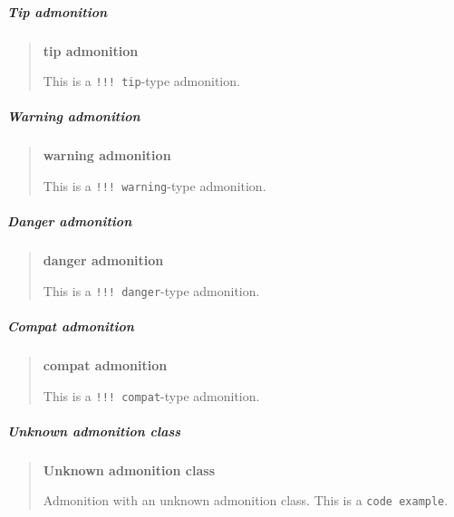 \subparagraph{Tip admonition}



\label{8478099471110135607}{}


\begin{quote}
\textbf{{\textquotesingle}tip{\textquotesingle} admonition}

This is a \texttt{!!! tip}-type admonition.

\end{quote}


\subparagraph{Warning admonition}



\label{16113256282093947986}{}


\begin{quote}
\textbf{{\textquotesingle}warning{\textquotesingle} admonition}

This is a \texttt{!!! warning}-type admonition.

\end{quote}


\subparagraph{Danger admonition}



\label{3138459326559650208}{}


\begin{quote}
\textbf{{\textquotesingle}danger{\textquotesingle} admonition}

This is a \texttt{!!! danger}-type admonition.

\end{quote}


\subparagraph{Compat admonition}



\label{8437579397049066350}{}


\begin{quote}
\textbf{{\textquotesingle}compat{\textquotesingle} admonition}

This is a \texttt{!!! compat}-type admonition.

\end{quote}


\subparagraph{Unknown admonition class}



\label{5611698449794175315}{}


\begin{quote}
\textbf{Unknown admonition class}

Admonition with an unknown admonition class. This is a \texttt{code example}.

\end{quote}


